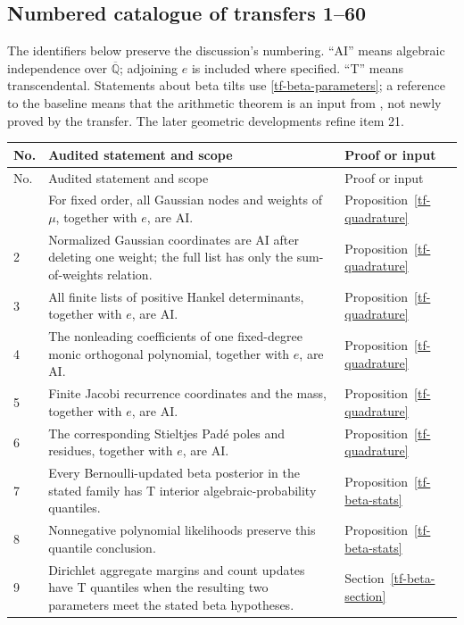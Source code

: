 \documentclass[11pt,a4paper]{article}
\theoremstyle{definition}
\theoremstyle{remark}
\numberwithin{equation}{section}
\newcommand{\Qbar}{\overline{\mathbb Q}}
\begin{document}
\subsection{Numbered catalogue of transfers 1--60}
\label{tf-catalogue}

The identifiers below preserve the discussion's numbering.  ``AI'' means
algebraic independence over $\Qbar$; adjoining $e$ is included where
specified.  ``T'' means transcendental.  Statements about beta tilts use
\eqref{tf-beta-parameters}; a reference to the baseline means that the
arithmetic theorem is an input from \cite{tf-baseline}, not newly proved
by the transfer.  The later geometric developments refine item 21.

\begingroup\small
\setlength{\tabcolsep}{4pt}
\renewcommand{\arraystretch}{1.1}
\begin{longtable}{@{}L{.055\textwidth}L{.68\textwidth}L{.205\textwidth}@{}}
\toprule
No. & Audited statement and scope & Proof or input\\
\midrule\endfirsthead
\toprule No. & Audited statement and scope & Proof or input\\\midrule\endhead
\bottomrule{} & For fixed order, all Gaussian nodes and weights of $\mu$, together with $e$, are AI. & Proposition~\ref{tf-quadrature}\\
2 & Normalized Gaussian coordinates are AI after deleting one weight; the full list has only the sum-of-weights relation. & Proposition~\ref{tf-quadrature}\\
3 & All finite lists of positive Hankel determinants, together with $e$, are AI. & Proposition~\ref{tf-quadrature}\\
4 & The nonleading coefficients of one fixed-degree monic orthogonal polynomial, together with $e$, are AI. & Proposition~\ref{tf-quadrature}\\
5 & Finite Jacobi recurrence coordinates and the mass, together with $e$, are AI. & Proposition~\ref{tf-quadrature}\\
6 & The corresponding Stieltjes Pad\'e poles and residues, together with $e$, are AI. & Proposition~\ref{tf-quadrature}\\
7 & Every Bernoulli-updated beta posterior in the stated family has T interior algebraic-probability quantiles. & Proposition~\ref{tf-beta-stats}\\
8 & Nonnegative polynomial likelihoods preserve this quantile conclusion. & Proposition~\ref{tf-beta-stats}\\
9 & Dirichlet aggregate margins and count updates have T quantiles when the resulting two parameters meet the stated beta hypotheses. & Section~\ref{tf-beta-section}\\

\end{longtable}
\end{document}
